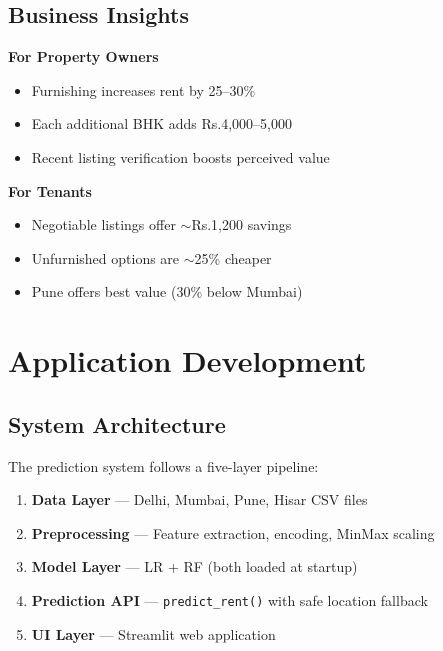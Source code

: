 \documentclass[12pt,a4paper]{article}
\makeatletter
\newcommand{\Rs}{Rs.\@}          %
\makeatother
\begin{document}
\subsection{Business Insights}
\begin{minipage}[t]{0.47\textwidth}
  \textbf{\color{Steel}For Property Owners}
  \begin{itemize}
    \item Furnishing increases rent by 25--30\%
    \item Each additional BHK adds \Rs4{,}000--5{,}000
    \item Recent listing verification boosts perceived value
  \end{itemize}
\end{minipage}\hfill
\begin{minipage}[t]{0.47\textwidth}
  \textbf{\color{Steel}For Tenants}
  \begin{itemize}
    \item Negotiable listings offer $\sim$\Rs1{,}200 savings
    \item Unfurnished options are $\sim$25\% cheaper
    \item Pune offers best value (30\% below Mumbai)
  \end{itemize}
\end{minipage}

\section{Application Development}

\subsection{System Architecture}
The prediction system follows a five-layer pipeline:
\begin{enumerate}
  \item \textbf{Data Layer} --- Delhi, Mumbai, Pune, Hisar CSV files
  \item \textbf{Preprocessing} --- Feature extraction, encoding, MinMax scaling
  \item \textbf{Model Layer} --- LR + RF (both loaded at startup)
  \item \textbf{Prediction API} --- \texttt{predict\_rent()} with safe location fallback
  \item \textbf{UI Layer} --- Streamlit web application
\end{enumerate}
\end{document}
